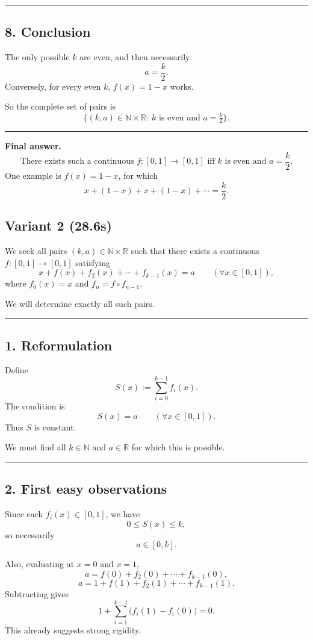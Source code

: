 \documentclass[12pt,a4paper]{article}
\begin{document}
\medskip\hrule\medskip


\subsection*{8. Conclusion}

The only possible \(k\) are even, and then necessarily
\[
a=\frac{k}{2}.
\]
Conversely, for every even \(k\), \(f(x)=1-x\) works.

So the complete set of pairs is
\[
\boxed{\{(k,a)\in\mathbb N\times\mathbb R:\ k \text{ is even and } a=\tfrac{k}{2}\}.}
\]


\medskip\hrule\medskip


\textbf{Final answer.}
\[
\boxed{\text{There exists such a continuous }f:[0,1]\to[0,1]\text{ iff }k\text{ is even and }a=\frac{k}{2}.}
\]
One example is \(f(x)=1-x\), for which
\[
x+(1-x)+x+(1-x)+\cdots = \frac{k}{2}.
\]
\newpage
\subsection{Variant 2 (28.6s)}
We seek all pairs \((k,a)\in \mathbb N\times \mathbb R\) such that there exists a continuous \(f:[0,1]\to[0,1]\) satisfying
\[
x+f(x)+f_2(x)+\cdots+f_{k-1}(x)=a \qquad (\forall x\in[0,1]),
\]
where \(f_0(x)=x\) and \(f_n=f\circ f_{n-1}\).

We will determine exactly all such pairs.


\medskip\hrule\medskip


\subsection*{1. Reformulation}

Define
\[
S(x):=\sum_{i=0}^{k-1} f_i(x).
\]
The condition is
\[
S(x)=a \qquad (\forall x\in[0,1]).
\]
Thus \(S\) is constant.

We must find all \(k\in\mathbb N\) and \(a\in\mathbb R\) for which this is possible.


\medskip\hrule\medskip


\subsection*{2. First easy observations}

Since each \(f_i(x)\in[0,1]\), we have
\[
0\le S(x)\le k,
\]
so necessarily
\[
a\in[0,k].
\]

Also, evaluating at \(x=0\) and \(x=1\),
\[
a=f(0)+f_2(0)+\cdots+f_{k-1}(0),
\]
\[
a=1+f(1)+f_2(1)+\cdots+f_{k-1}(1).
\]
Subtracting gives
\[
1+\sum_{i=1}^{k-1}\bigl(f_i(1)-f_i(0)\bigr)=0.
\]
This already suggests strong rigidity.
\end{document}
